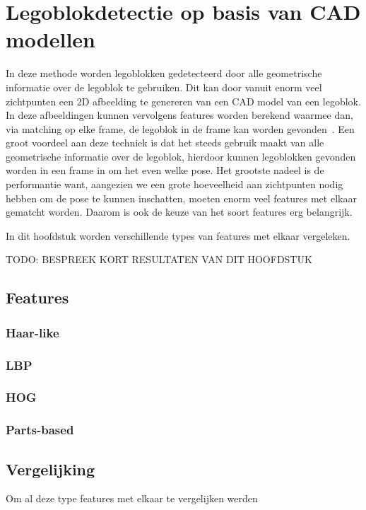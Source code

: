 \chapter{Legoblokdetectie op basis van CAD modellen}
\label{hoofdstuk:3}
In deze methode worden legoblokken gedetecteerd door alle geometrische informatie over de legoblok te gebruiken. Dit kan door vanuit enorm veel zichtpunten een 2D afbeelding te genereren van een CAD model van een legoblok. In deze afbeeldingen kunnen vervolgens features worden berekend waarmee dan, via matching op elke frame, de legoblok in de frame kan worden gevonden~\cite{aubry2014seeing}. Een groot voordeel aan deze techniek is dat het steeds gebruik maakt van alle geometrische informatie over de legoblok, hierdoor kunnen legoblokken gevonden worden in een frame in om het even welke pose. Het grootste nadeel is de performantie want, aangezien we een grote hoeveelheid aan zichtpunten nodig hebben om de pose te kunnen inschatten, moeten enorm veel features met elkaar gematcht worden. Daarom is ook de keuze van het soort features erg belangrijk.

In dit hoofdstuk worden verschillende types van features met elkaar vergeleken.

TODO: BESPREEK KORT RESULTATEN VAN DIT HOOFDSTUK %

\section{Features}
\subsection{Haar-like}
\subsection{LBP}
\subsection{HOG}
\subsection{Parts-based}

\section{Vergelijking}

Om al deze type features met elkaar te vergelijken werden


